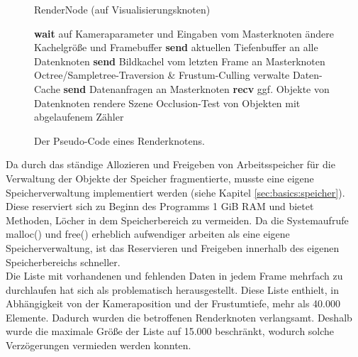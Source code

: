 \begin{figure}[ttt!]
\centering
 \begin{minipage}[t]{12.5cm}
\begin{algorithm}[H]
  \caption{RenderNode (auf Visualisierungsknoten)\label{alg:impl:rendernode}} 
    \begin{algorithmic} [1]
	\STATE \textbf{wait} auf Kameraparameter und Eingaben vom Masterknoten
	  \STATE ändere Kachelgröße und Framebuffer
	  \STATE \textbf{send} aktuellen Tiefenbuffer an alle Datenknoten
	\ENDIF
	\STATE \textbf{send} Bildkachel vom letzten Frame an Masterknoten
	\STATE Octree/Sampletree-Traversion \& Frustum-Culling
	\STATE verwalte Daten-Cache
	\STATE \textbf{send} Datenanfragen an Masterknoten
	\STATE \textbf{recv} ggf. Objekte von Datenknoten
	\STATE rendere Szene
	\STATE Occlusion-Test von Objekten mit abgelaufenem Zähler
      \ENDWHILE
    \end{algorithmic}
\end{algorithm}
 \end{minipage}
\caption{\label{fig:impl:rendernode}Der Pseudo-Code eines Renderknotens.}
\end{figure}
Da durch das ständige Allozieren und Freigeben von Arbeitsspeicher für die Verwaltung der Objekte der Speicher fragmentierte, musste eine eigene Speicherverwaltung implementiert werden (siehe Kapitel \ref{sec:basics:speicher}). Diese reserviert sich zu Beginn des Programms 1 GiB RAM und bietet Methoden, Löcher in dem Speicherbereich zu vermeiden. Da die Systemaufrufe malloc() und free() erheblich aufwendiger arbeiten als eine eigene Speicherverwaltung, ist das Reservieren und Freigeben innerhalb des eigenen Speicherbereichs schneller.\\
Die Liste mit vorhandenen und fehlenden Daten in jedem Frame mehrfach zu durchlaufen hat sich als problematisch herausgestellt. Diese Liste enthielt, in Abhängigkeit von der Kameraposition und der Frustumtiefe, mehr als 40.000 Elemente. Dadurch wurden die betroffenen Renderknoten verlangsamt. Deshalb wurde die maximale Größe der Liste auf 15.000 beschränkt, wodurch solche Verzögerungen vermieden werden konnten.

